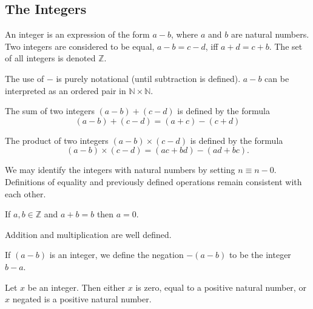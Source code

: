 \documentclass{article}
\begin{document}
\subsection{The Integers}
\begin{definition}[Integers]
	An integer is an expression of the form \(a-b\), where \(a\) and \(b\) are natural numbers. Two integers are considered to be equal, \(a-b=c-d\), iff \(a+d=c+b\). The set of all integers is denoted \(\mathbb{Z}\).
\end{definition}
\begin{remark}
	The use of \(-\) is purely notational (until subtraction is defined). \(a-b\) can be interpreted as an ordered pair in \(\mathbb{N}\times\mathbb{N}\).
\end{remark}
\begin{definition}
	The sum of two integers \((a-b)+(c-d)\) is defined by the formula
	\begin{equation*}
		(a-b)+(c-d)=(a+c)-(c+d)
	\end{equation*}
\end{definition}
\begin{definition}
	The product of two integers \((a-b)\times (c-d)\) is defined by the formula
	\begin{equation*}
		(a-b)\times(c-d)=(ac+bd)-(ad+bc).
	\end{equation*}
\end{definition}
\begin{remark}
	We may identify the integers with natural numbers by setting \(n\equiv n-0\). Definitions of equality and previously defined operations remain consistent with each other.
\end{remark}
\begin{proposition}
	\label{addzero}
	If \(a,b\in\mathbb{Z}\) and \(a+b=b\) then \(a=0\).
\end{proposition}
\begin{lemma}
	Addition and multiplication are well defined.
\end{lemma}
\begin{definition}
	If \((a-b)\) is an integer, we define the negation \(-(a-b)\) to be the integer \(b-a\).
\end{definition}
\begin{lemma}
	Let \(x\) be an integer. Then either \(x\) is zero, equal to a positive natural number, or \(x\) negated is a positive natural number.
\end{lemma}
\end{document}
